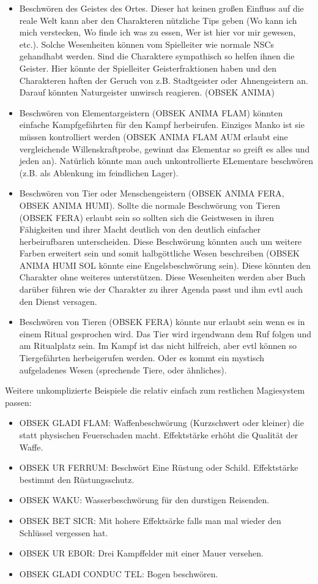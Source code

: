\documentclass{article}
\begin{document}
\begin{itemize}
\item Beschwören des Geistes des Ortes. Dieser hat keinen großen Einfluss auf die reale Welt kann aber den Charakteren nützliche Tips geben (Wo kann ich mich verstecken, Wo finde ich was zu essen, Wer ist hier vor mir gewesen, etc.). Solche Wesenheiten können vom Spielleiter wie normale NSCs gehandhabt werden. Sind die Charaktere sympathisch so helfen ihnen die Geister. Hier könnte der Spielleiter Geisterfraktionen haben und den Charakteren haften der Geruch von z.B. Stadtgeister oder Ahnengeistern an. Darauf könnten Naturgeister unwirsch reagieren. (OBSEK ANIMA)
\item Beschwören von Elementargeistern (OBSEK ANIMA FLAM) könnten einfache Kampfgefährten für den Kampf herbeirufen. Einziges Manko ist sie müssen kontrolliert werden (OBSEK ANIMA FLAM AUM erlaubt eine vergleichende Willenskraftprobe, gewinnt das Elementar so greift es alles und jeden an). Natürlich könnte man auch unkontrollierte ELementare beschwören (z.B. als Ablenkung im feindlichen Lager).
\item Beschwören von Tier oder Menschengeistern (OBSEK ANIMA FERA, OBSEK ANIMA HUMI). Sollte die normale Beschwörung von Tieren (OBSEK FERA) erlaubt sein so sollten sich die Geistwesen in ihren Fähigkeiten und ihrer Macht deutlich von den deutlich einfacher herbeirufbaren unterscheiden. Diese Beschwörung könnten auch um weitere Farben erweitert sein und somit halbgöttliche Wesen beschreiben (OBSEK ANIMA HUMI SOL könnte eine Engelsbeschwörung sein). Diese könnten den Charakter ohne weiteres unterstützen. Diese Wesenheiten werden aber Buch darüber führen wie der Charakter zu ihrer Agenda passt und ihm evtl auch den Dienst versagen.
\item Beschwören von Tieren (OBSEK FERA) könnte nur erlaubt sein wenn es in einem Ritual gesprochen wird. Das Tier wird irgendwann dem Ruf folgen und am Ritualplatz sein. Im Kampf ist das nicht hilfreich, aber evtl können so Tiergefährten herbeigerufen werden. Oder es kommt ein mystisch aufgeladenes Wesen (sprechende Tiere, oder ähnliches).
\end{itemize}

Weitere unkomplizierte Beispiele die relativ einfach zum restlichen Magiesystem passen:

\begin{itemize}
\item OBSEK GLADI FLAM: Waffenbeschwörung (Kurzschwert oder kleiner) die statt physischen Feuerschaden macht. Effektstärke erhöht die Qualität der Waffe.
\item OBSEK UR FERRUM: Beschwört Eine Rüstung oder Schild. Effektstärke bestimmt den Rüstungsschutz.
\item OBSEK WAKU: Wasserbeschwörung für den durstigen Reisenden.
\item OBSEK BET SICR: Mit hohere Effektsärke falls man mal wieder den Schlüssel vergessen hat.
\item OBSEK UR EBOR: Drei Kampffelder mit einer Mauer versehen.
\item OBSEK GLADI CONDUC TEL: Bogen beschwören.
\end{itemize}
\end{document}

